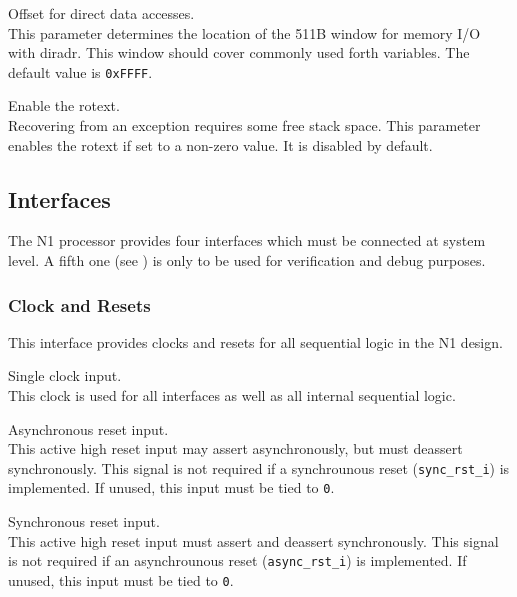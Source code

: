 \begin{description}[style=nextline]
\item[\texttt{PBUS\_MADR\_OFFSET}] Offset for direct data accesses. \\
  This parameter determines the location of the 511B window for memory I/O with \gls{diradr}.
  This window should cover commonly used \gls{forth} variables. The default value is \texttt{0xFFFF}. 

\item[\texttt{EXT\_ROT}] Enable the \gls{rotext}. \\
  Recovering from an exception requires some free \gls{stack} space.
  This parameter enables the \gls{rotext} if set to a non-zero value. It is disabled by default.

\end{description}

\subsection{Interfaces}
\label{integration:if}

The N1 processor provides four interfaces which must be connected at system level.
A fifth one (see ) is only to be used for verification and debug purposes.

\subsubsection{Clock and Resets}
\label{integration:if:clk}
This interface provides clocks and resets for all sequential logic in the N1 design.

\begin{description}[style=nextline]

\item[\texttt{clk\_i}] Single clock input. \\  
  This clock is used for all interfaces as well as all internal sequential logic.

\item[\texttt{async\_rst\_i}] Asynchronous reset input. \\
  This active high reset input may assert asynchronously, but must deassert synchronously.
  This signal is not required if a synchrounous reset (\texttt{sync\_rst\_i}) is implemented.
  If unused, this input must be tied to \texttt{0}.

\item[\texttt{sync\_rst\_i}] Synchronous reset input. \\
  This active high reset input must assert and deassert synchronously.
  This signal is not required if an asynchrounous reset (\texttt{async\_rst\_i}) is implemented.
  If unused, this input must be tied to \texttt{0}.
 
\end{description}

